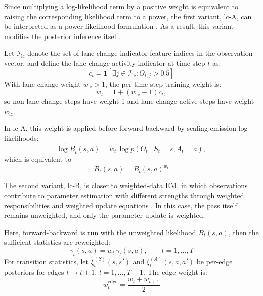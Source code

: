 \par  
Since multiplying a log-likelihood term by a positive weight is equivalent to raising the corresponding likelihood term to a power, 
the first variant, lc-A, can be interpreted as a power-likelihood formulation \cite{holmes2017assigningvaluepowerlikelihood}. 
As a result, this variant modifies the posterior inference itself.

Let \(\mathcal{I}_{\mathrm{lc}}\) denote the set of lane-change indicator feature indices in the observation vector, 
and define the lane-change activity indicator at time step \(t\) as:
\begin{equation}
c_t
=
\mathbf{1}\!\left[\exists j \in \mathcal{I}_{\mathrm{lc}}: O_{t,j} > 0.5\right]
\end{equation}
With lane-change weight \(w_{\mathrm{lc}} > 1\), the per-time-step training weight is:
\begin{equation}
w_t = 1 + (w_{\mathrm{lc}} - 1)c_t,
\end{equation}
so non-lane-change steps have weight 1 and lane-change-active steps have weight \(w_{\mathrm{lc}}\).

In lc-A, this weight is applied before forward-backward by scaling emission log-likelihoods:
\begin{equation}
\widetilde{\log B}_t(s,a)
=
w_t\,\log p\!\left(O_t \mid S_t=s, A_t=a\right),
\end{equation}
which is equivalent to
\begin{equation}
\widetilde{B}_t(s,a) = B_t(s,a)^{w_t}
\end{equation}

\par The second variant, lc-B, is closer to weighted-data \ac{EM}, in which observations contribute to parameter estimation with different strengths 
through weighted responsibilities and weighted update equations \cite{Gebru_2016}. 
In this case, the pass itself remains unweighted, and only the parameter update is weighted.

Here, forward-backward is run with the unweighted likelihood \(B_t(s,a)\), then the sufficient statistics are reweighted:
\begin{equation}
\widetilde{\gamma}_t(s,a) = w_t\,\gamma_t(s,a), \qquad t=1,\dots,T
\end{equation}
For transition statistics, let \(\xi_t^{(S)}(s,s')\) and \(\xi_t^{(A)}(s,a,a')\) be per-edge posteriors for edges \(t \to t+1\), \(t=1,\dots,T-1\). 
The edge weight is:
\begin{equation}
w_t^{\mathrm{edge}} = \frac{w_t + w_{t+1}}{2}
\end{equation}

